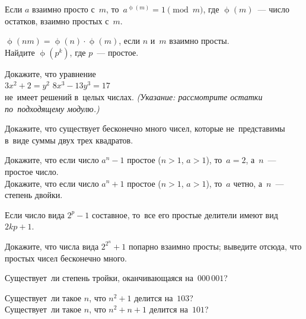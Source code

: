 


\begingroup
    \ifdefined\mathup
        \def\eulerphi{\mathup{\phi}}%
    \else
        \def\eulerphi{\upphi}%
    \fi

Если $a$ взаимно просто с~$m$, то~$a^{\eulerphi(m)} = 1 \pmod{m}$, где
$\eulerphi(m)$~--- число остатков, взаимно простых с~$m$.

\begin{problems}

\subproblem
$\eulerphi(n m) = \eulerphi(n) \cdot \eulerphi(m)$, если $n$ и~$m$ взаимно
просты.
\\
\subproblem
Найдите $\eulerphi(p^{k})$, где $p$~--- простое.

\end{problems}

\hrulefill

\begin{problems}

\item
Докажите, что уравнение
\\
\subproblem $3 x^2 + 2 = y^2$
\qquad
\subproblem $8 x^3 - 13 y^3 = 17$
\\
не~имеет решений в~целых числах.
\emph{(Указание: рассмотрите остатки по~подходящему модулю.)}

\item
Докажите, что существует бесконечно много чисел, которые не~представимы в~виде
суммы
\quad
\subproblem двух
\quad
\subproblem трех
\quad
квадратов.

\item
\subproblem
Докажите, что если число $a^{n} - 1$ простое ($n > 1$, $a > 1$), то~$a = 2$,
а~$n$~--- простое число.
\\
\subproblem
Докажите, что если число $a^{n} + 1$ простое ($n > 1$, $a > 1$), то~$a$ четно,
а~$n$~--- степень двойки.

\item
Если число вида $2^{p} - 1$ составное, то~все его простые делители имеют вид
$2 k p + 1$.

\item
Докажите, что числа вида $2^{2^n} + 1$ попарно взаимно просты;
выведите отсюда, что простых чисел бесконечно много.

\item
Существует~ли степень тройки, оканчивающаяся на~$000\,001$?

\item
\subproblem
Существует~ли такое $n$, что $n^2 + 1$ делится на~$103$?
\\
\subproblem
Существует~ли такое $n$, что $n^2 + n + 1$ делится на~$101$?

\end{problems}

\endgroup %

